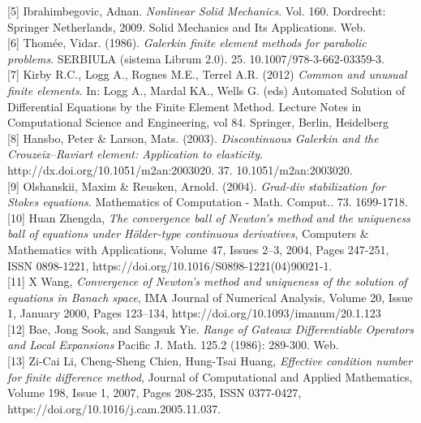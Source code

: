 \documentclass[11pt,twoside,a4paper]{article}
\begin{document}
[5] Ibrahimbegovic, Adnan. \textit{Nonlinear Solid Mechanics}. Vol. 160. Dordrecht: Springer Netherlands, 2009. Solid Mechanics and Its Applications. Web.\\

[6] Thomée, Vidar. (1986). \textit{Galerkin finite element methods for parabolic problems}. SERBIULA (sistema Librum 2.0). 25. 10.1007/978-3-662-03359-3. \\

[7]  Kirby R.C., Logg A., Rognes M.E., Terrel A.R. (2012) \textit{Common and unusual finite elements}. In: Logg A., Mardal KA., Wells G. (eds) Automated Solution of Differential Equations by the Finite Element Method. Lecture Notes in Computational Science and Engineering, vol 84. Springer, Berlin, Heidelberg\\

[8] Hansbo, Peter \& Larson, Mats. (2003). \textit{Discontinuous Galerkin and the Crouzeix–Raviart element: Application to elasticity}. http://dx.doi.org/10.1051/m2an:2003020. 37. 10.1051/m2an:2003020. \\

[9] Olshanskii, Maxim \& Reusken, Arnold. (2004). \textit{Grad-div stabilization for Stokes equations}. Mathematics of Computation - Math. Comput.. 73. 1699-1718. \\

[10] Huan Zhengda, \textit{The convergence ball of Newton's method and the uniqueness ball of equations under Hölder-type continuous derivatives},
Computers \& Mathematics with Applications,
Volume 47, Issues 2–3,
2004,
Pages 247-251,
ISSN 0898-1221,
https://doi.org/10.1016/S0898-1221(04)90021-1.\\

[11] X Wang, \textit{Convergence of Newton's method and uniqueness of the solution of equations in Banach space}, IMA Journal of Numerical Analysis, Volume 20, Issue 1, January 2000, Pages 123–134, https://doi.org/10.1093/imanum/20.1.123\\

[12] Bae, Jong Sook, and Sangsuk Yie. \textit{Range of Gateaux Differentiable Operators and Local Expansions}  Pacific J. Math. 125.2 (1986): 289-300. Web.\\

[13] Zi-Cai Li, Cheng-Sheng Chien, Hung-Tsai Huang,\textit{
Effective condition number for finite difference method},
Journal of Computational and Applied Mathematics,
Volume 198, Issue 1,
2007,
Pages 208-235,
ISSN 0377-0427,
https://doi.org/10.1016/j.cam.2005.11.037.\\
\end{document}
